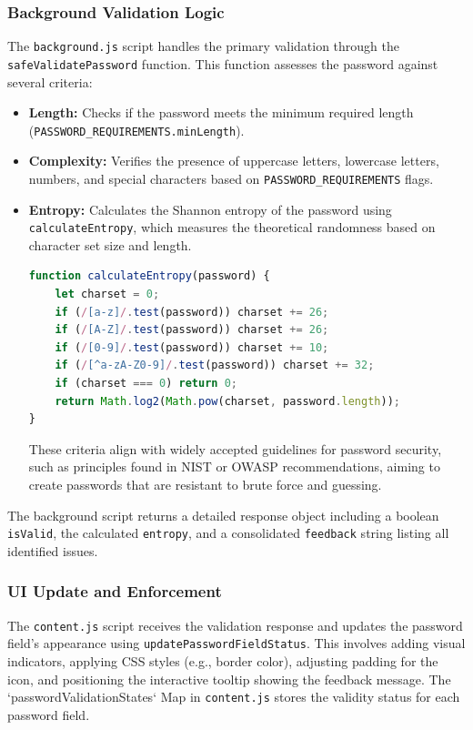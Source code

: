 \documentclass[11pt,oneside,a4paper]{book}
\begin{document}
\subsubsection{Background Validation Logic}
The \texttt{background.js} script handles the primary validation through the \texttt{safeValidatePassword} function. This function assesses the password against several criteria:
\begin{itemize}
    \item \textbf{Length:} Checks if the password meets the minimum required length\\ (\texttt{PASSWORD\_REQUIREMENTS.minLength}).
    \item \textbf{Complexity:} Verifies the presence of uppercase letters, lowercase letters, numbers, and special characters based on \texttt{PASSWORD\_REQUIREMENTS} flags.
    \item \textbf{Entropy:} Calculates the Shannon entropy of the password using \texttt{calculateEntropy}, which measures the theoretical randomness based on character set size and length.
    \begin{lstlisting}[language=JavaScript, caption=Entropy Calculation]
function calculateEntropy(password) {
    let charset = 0;
    if (/[a-z]/.test(password)) charset += 26;
    if (/[A-Z]/.test(password)) charset += 26;
    if (/[0-9]/.test(password)) charset += 10;
    if (/[^a-zA-Z0-9]/.test(password)) charset += 32;
    if (charset === 0) return 0;
    return Math.log2(Math.pow(charset, password.length));
}
    \end{lstlisting}
    These criteria align with widely accepted guidelines for password security, such as principles found in NIST or OWASP recommendations, aiming to create passwords that are resistant to brute force and guessing.
\end{itemize}
The background script returns a detailed response object including a boolean \texttt{isValid}, the calculated \texttt{entropy}, and a consolidated \texttt{feedback} string listing all identified issues.

\subsubsection{UI Update and Enforcement}
The \texttt{content.js} script receives the validation response and updates the password field's appearance using \texttt{updatePasswordFieldStatus}. This involves adding visual indicators, applying CSS styles (e.g., border color), adjusting padding for the icon, and positioning the interactive tooltip showing the feedback message. The `passwordValidationStates` Map in \texttt{content.js} stores the validity status for each password field.
\end{document}

